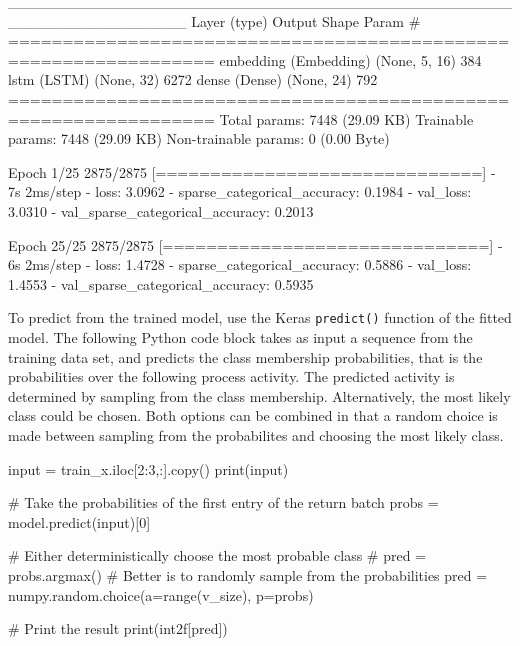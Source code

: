 \begin{samepage}
\begin{textcode}
_________________________________________________________________
 Layer (type)                Output Shape              Param #   
=================================================================
 embedding (Embedding)       (None, 5, 16)             384       
 lstm (LSTM)                 (None, 32)                6272      
 dense (Dense)               (None, 24)                792       
=================================================================
Total params: 7448 (29.09 KB)
Trainable params: 7448 (29.09 KB)
Non-trainable params: 0 (0.00 Byte)

Epoch 1/25
2875/2875 [==============================] - 7s 2ms/step - 
loss: 3.0962 - sparse_categorical_accuracy: 0.1984 - 
val_loss: 3.0310 - val_sparse_categorical_accuracy: 0.2013

Epoch 25/25
2875/2875 [==============================] - 6s 2ms/step - 
loss: 1.4728 - sparse_categorical_accuracy: 0.5886 - 
val_loss: 1.4553 - val_sparse_categorical_accuracy: 0.5935
\end{textcode}
\end{samepage}

To predict from the trained model, use the Keras \texttt{predict()} function of the fitted model. The following Python code block takes as input a sequence from the training data set, and predicts the class membership probabilities, that is the probabilities over the following process activity. The predicted activity is determined by sampling from the class membership. Alternatively, the most likely class could be chosen. Both options can be combined in that a random choice is made between sampling from the probabilites and choosing the most likely class. 

\begin{samepage}
\begin{pythoncode}
input = train_x.iloc[2:3,:].copy()
print(input)

# Take the probabilities of the first entry of the return batch
probs = model.predict(input)[0]

# Either deterministically choose the most probable class
# pred = probs.argmax()
# Better is to randomly sample from the probabilities
pred = numpy.random.choice(a=range(v_size), p=probs)

# Print the result
print(int2f[pred])
\end{pythoncode}
\end{samepage}

